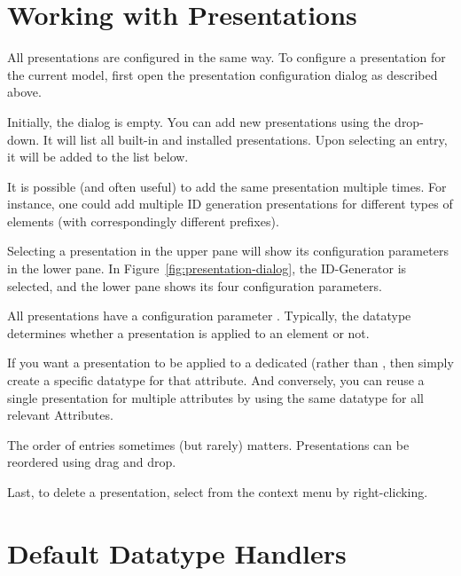 \section{Working with Presentations}

All presentations are configured in the same way.  To configure a presentation for the current model, first open the presentation configuration dialog as described above.

Initially, the dialog is empty.  You can add new presentations using the  drop-down.  It will list all built-in and installed presentations.  Upon selecting an entry, it will be added to the list below.

\begin{info}It is possible (and often useful) to add the same presentation multiple times. For instance, one could add multiple ID generation presentations for different types of elements (with correspondingly different prefixes). 
\end{info}

Selecting a presentation in the upper pane will show its configuration parameters in the lower pane.  In Figure~\ref{fig:presentation-dialog}, the ID-Generator is selected, and the lower pane shows its four configuration parameters.

All presentations have a configuration parameter .  Typically, the datatype determines whether a presentation is applied to an element or not.

\begin{info}
  If you want a presentation to be applied to a dedicated  (rather than , then simply create a specific datatype for that attribute. And conversely, you can reuse a single presentation for multiple attributes by using the same datatype for all relevant Attributes.
\end{info}

The order of entries sometimes (but rarely) matters.  Presentations can be reordered using drag and drop.

Last, to delete a presentation, select  from the context menu by right-clicking.

\section{Default Datatype Handlers}

